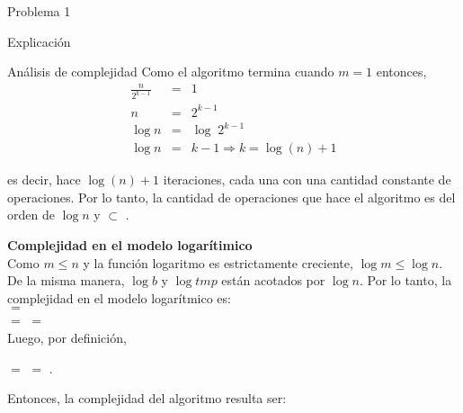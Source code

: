 \begin{section}{Problema 1}
\begin{subsection}{Explicación}
\begin{subsubsection}{Análisis de complejidad}
		\noindent Como el algoritmo termina cuando $m=1$ entonces, \\
		\begin{eqnarray*}
			\frac{n}{2^{k-1}}&=& 1 \\
			n &=& 2^{k-1} \\
			\log n &=& \log\; 2^{k-1} \\
			\log n &=& k-1 \Rightarrow k = \log( n )+1
		\end{eqnarray*}

		\noindent es decir, hace $\log(n)+1$ iteraciones, cada una con una cantidad constante de operaciones. 
		Por lo tanto, la cantidad de operaciones que hace el algoritmo es del orden de $\log n$ y  $\subset$ .

		\vspace{0.5cm}
		\noindent\textbf{Complejidad en el modelo logarítimico}\\

Como $m\leq n$ y la función logaritmo es estrictamente creciente, $\log m \leq \log n$. De la misma manera, $\log b$ y $\log tmp$ están acotados por $\log n$. Por lo tanto, la complejidad en el modelo logarítmico es: \\
 $=$ \\
$=$  $=$  \\
Luego, por definición, 
			\begin{center}
				 $=$  $=$ .
			\end{center}




		Entonces, la complejidad del algoritmo resulta ser: \VSP
		

\end{subsubsection}
\end{subsection}
\end{section}
